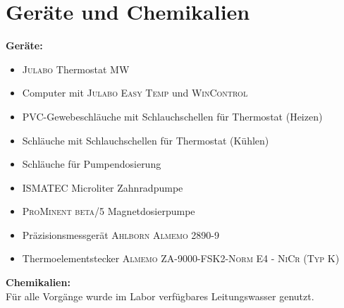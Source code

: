 \section{Geräte und Chemikalien}
\label{sec:geraete}

\textbf{Geräte:}
\begin{itemize}
	\item \textsc{Julabo} Thermostat MW
	\item Computer mit \textsc{Julabo Easy Temp} und \textsc{WinControl}
	\item PVC-Gewebeschläuche mit Schlauchschellen für Thermostat (Heizen)
	\item {} Schläuche mit Schlauchschellen für Thermostat (Kühlen)
	\item {} Schläuche für Pumpendosierung
	\item \textsc{ISMATEC} Microliter Zahnradpumpe
	\item \textsc{ProMinent beta/5} Magnetdosierpumpe 
	\item Präzisionsmessgerät \textsc{Ahlborn Almemo 2890-9}
	\item Thermoelementstecker \textsc{Almemo ZA-9000-FSK2-Norm E4 - NiCr (Typ K)}
\end{itemize}

\textbf{Chemikalien:}\\
Für alle Vorgänge wurde im Labor verfügbares Leitungswasser genutzt.